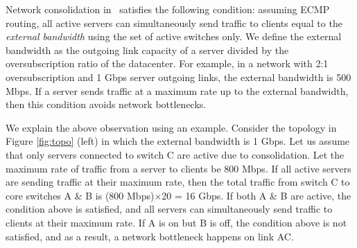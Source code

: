
Network consolidation in \shrink\ satisfies the following condition: assuming ECMP routing, all active servers can simultaneously send traffic to clients equal to the \emph{external bandwidth} using the set of active switches only. We define the external bandwidth as the outgoing link capacity of a server divided by the oversubscription ratio of the datacenter. For example, in a network with 2:1 oversubscription and 1 Gbps server outgoing links, the external bandwidth is 500 Mbps. If a server sends traffic at a maximum rate up to the external bandwidth, then this condition avoids network bottlenecks.  

We explain the above observation using an example. Consider the topology in Figure \ref{fig:topo} (left) in which the external bandwidth is 1 Gbps. Let us assume that only servers connected to switch C are active due to consolidation. Let the maximum rate of traffic from a server to clients be 800 Mbps. If all active servers are sending traffic at their maximum rate, then the total traffic from switch C to core switches A \& B is (800 Mbps)$\times$20 = 16 Gbps. If both A \& B are active, the condition above is satisfied, and all servers can simultaneously send traffic  to clients at their maximum rate. If  A is on but B is off, the condition above is not satisfied, and as a result, a network bottleneck happens on link AC.


